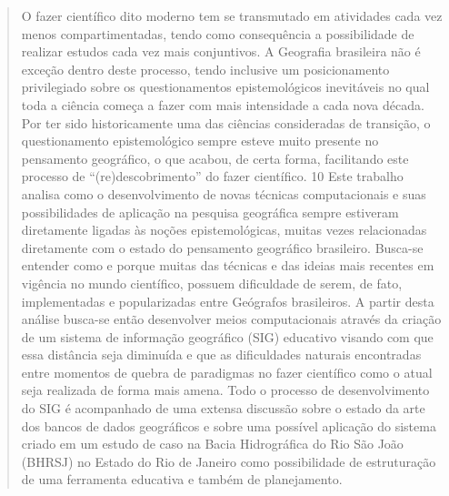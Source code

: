 \documentclass[12pt,a4paper,openany]{book} %
\begin{document}
	\begin{quote}
		O fazer científico dito moderno tem se transmutado em atividades cada vez menos compartimentadas, tendo como consequência a possibilidade de realizar estudos cada vez mais conjuntivos. A Geografia brasileira não é exceção dentro deste processo, tendo inclusive um posicionamento privilegiado sobre os questionamentos epistemológicos inevitáveis no qual toda a ciência começa a fazer com mais intensidade a cada nova década. Por ter sido historicamente uma das ciências consideradas de transição, o questionamento epistemológico sempre esteve muito presente no pensamento geográfico, o que acabou, de certa forma, facilitando este processo de “(re)descobrimento” do fazer científico.
		10	Este trabalho analisa como o desenvolvimento de novas técnicas computacionais e suas possibilidades de aplicação na pesquisa geográfica sempre estiveram diretamente ligadas às noções epistemológicas, muitas vezes relacionadas diretamente com o estado do pensamento geográfico brasileiro. Busca-se entender como e porque muitas das técnicas e das ideias mais recentes em vigência no mundo científico, possuem dificuldade de serem, de fato, implementadas e popularizadas entre Geógrafos brasileiros. 
		A partir desta análise busca-se então desenvolver meios computacionais através da criação de um sistema de informação geográfico (SIG) educativo visando com que essa distância seja diminuída e que as dificuldades naturais encontradas entre momentos de quebra de paradigmas no fazer científico como o atual seja realizada de forma mais amena. 
		Todo o processo de desenvolvimento do SIG é acompanhado de uma extensa discussão sobre o estado da arte dos bancos de dados geográficos e sobre uma possível aplicação do sistema criado em um estudo de caso na Bacia Hidrográfica do Rio São João (BHRSJ) no Estado do Rio de Janeiro como possibilidade de estruturação de uma ferramenta educativa e também de planejamento.
	\end{quote}
\end{document}
